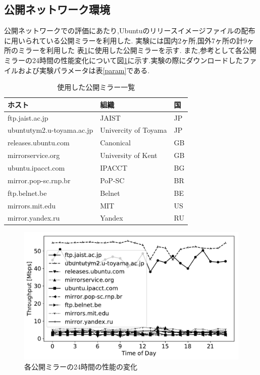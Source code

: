 \documentclass[a4j,12pt]{gradthesis_utf8}
\begin{document}
\newpage

\subsection{公開ネットワーク環境}
\label{pub}
公開ネットワークでの評価にあたり,Ubuntuのリリースイメージファイルの配布に用いられている公開ミラー\cite{ubuntu}を利用した.
実験には国内2ヶ所,国外7ヶ所の計9ヶ所のミラーを利用した
表\ref{tablemirror}に使用した公開ミラーを示す.
また,参考として各公開ミラーの24時間の性能変化について図\ref{24h}に示す.実験の際にダウンロードしたファイルおよび実験パラメータは表\ref{param}である.
\begin{table}[h]
	\begin{center}
		\caption{使用した公開ミラー一覧}
		\label{tablemirror}
		\begin{tabular}{|l|l|l|} \hline
			ホスト & 組織 & 国\\ \hline \hline
			ftp.jaist.ac.jp & JAIST & JP \\
			ubuntutym2.u-toyama.ac.jp & Univercity of Toyama & JP \\
			releases.ubuntu.com & Canonical & GB \\
			mirrorservice.org & University of Kent & GB \\
			ubuntu.ipacct.com & IPACCT & BG \\
			mirror.pop-sc.rnp.br & PoP-SC & BR \\
			ftp.belnet.be & Belnet & BE \\
			mirrors.mit.edu & MIT & US \\
			mirror.yandex.ru & Yandex & RU \\ \hline
		\end{tabular}
	\end{center}
\end{table}

\begin{figure}[h]
	\includegraphics[width=14cm]{figure/thp24h-g.pdf}
	\caption{各公開ミラーの24時間の性能の変化}
	\label{24h}
\end{figure}
\end{document}
